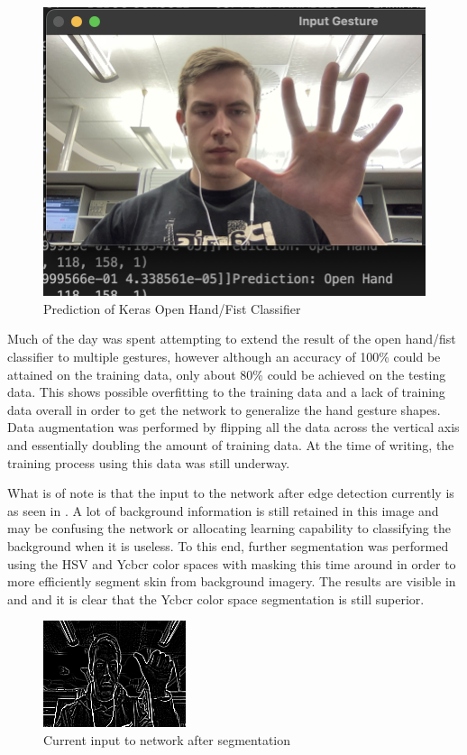 \begin{figure}[h]
    \centering
    \includegraphics[width=0.6\linewidth]{figures/tensorflow_open_hand_fist_prediction2.png}
    \caption{Prediction of Keras Open Hand/Fist Classifier}
    \label{fig:tensorflow_open_hand_fist_prediction2}
\end{figure}

Much of the day was spent attempting to extend the result of the open hand/fist classifier to multiple gestures, however although an accuracy of 100\% could be attained on the training data, only about 80\% could be achieved on the testing data. This shows possible overfitting to the training data and a lack of training data overall in order to get the network to generalize the hand gesture shapes. Data augmentation was performed by flipping all the data across the vertical axis and essentially doubling the amount of training data. At the time of writing, the training process using this data was still underway.

What is of note is that the input to the network after edge detection currently is as seen in . A lot of background information is still retained in this image and may be confusing the network or allocating learning capability to classifying the background when it is useless. To this end, further segmentation was performed using the HSV and Ycbcr color spaces with masking this time around in order to more efficiently segment skin from background imagery. The results are visible in  and  and it is clear that the Ycbcr color space segmentation is still superior. 


\begin{figure}[h]
    \centering
    \includegraphics[width=0.6\linewidth]{figures/NN_segmented_edge_detected.png}
    \caption{Current input to network after segmentation}
    \label{fig:NN_segmented_edge_detected}
\end{figure}


